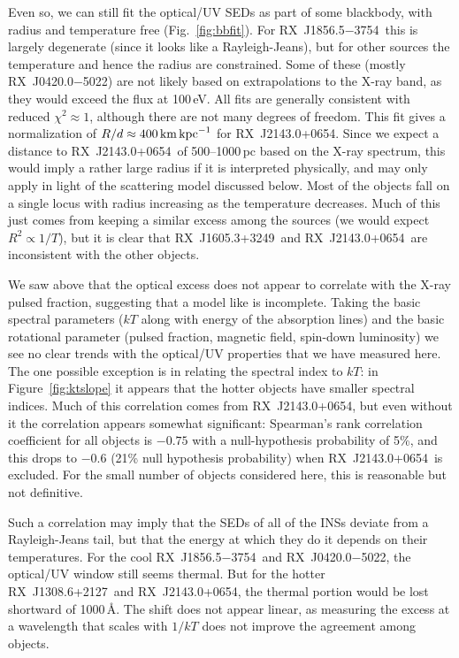 \documentclass[iop]{emulateapj}
\newcommand{\rxjw}{RX~J1856.5$-$3754}
\newcommand{\rbs}{RX~J1308.6+2127}
\newcommand{\rbsb}{RX~J2143.0+0654}
\newcommand{\rxjvk}{RX~J1605.3+3249}
\newcommand{\rxjb}{RX~J0420.0$-$5022}
\begin{document}
Even so, we can still fit the optical/UV SEDs as part of some
blackbody, with radius and temperature free (Fig.~\ref{fig:bbfit}).
For \rxjw\ this is largely degenerate (since it looks like a
Rayleigh-Jeans), but for other sources the temperature and hence the
radius are constrained.  Some of these (mostly \rxjb) are not likely
based on extrapolations to the X-ray band, as they would exceed the
flux at 100\,eV.  All fits are generally consistent with reduced
$\chi^2\approx 1$, although there are not many degrees of freedom.
This fit gives a normalization of $R/d\approx 400\,{\rm km\,kpc}^{-1}$
for \rbsb.  Since we expect a distance to \rbsb\ of 500--1000\,pc
based on the X-ray spectrum, this would imply a rather large radius if
it is interpreted physically, and may only apply in light of the
scattering model discussed below.  Most of the objects fall on a
single locus with radius increasing as the temperature decreases.
Much of this just comes from keeping a similar excess among the
sources (we would expect $R^2\propto 1/T$), but it is clear that
\rxjvk\ and \rbsb\ are inconsistent with the other objects.


We saw above that the optical excess does not appear to correlate with
the X-ray pulsed fraction, suggesting that a model like \citet{br02}
is incomplete.  Taking the basic spectral parameters ($kT$ along with
energy of the absorption lines) and the basic rotational parameter
(pulsed fraction, magnetic field, spin-down luminosity) we see no
clear trends with the optical/UV properties that we have measured
here.  The one possible exception is in relating the spectral index to
$kT$: in Figure~\ref{fig:ktslope} it appears that the hotter objects
have smaller spectral indices.  Much of this correlation comes from
\rbsb, but even without it the correlation appears somewhat
significant: Spearman's rank correlation coefficient
\citep[][p.\ 641]{numrec} for all objects is $-0.75$ with a
null-hypothesis probability of 5\%, and this drops to $-0.6$ (21\%
null hypothesis probability) when \rbsb\ is excluded.  For the small
number of objects considered here, this is reasonable but not
definitive.

Such a correlation may imply that the SEDs of all of the INSs deviate
from a Rayleigh-Jeans tail, but that the energy at which they do it
depends on their temperatures.  For the cool \rxjw\ and \rxjb, the
optical/UV window still seems thermal.  But for the hotter \rbs\ and
\rbsb, the thermal portion would be lost shortward of 1000\,\AA.  The
shift does not appear linear, as measuring the excess at a wavelength
that scales with $1/kT$ does not improve the agreement among objects.
\end{document}

